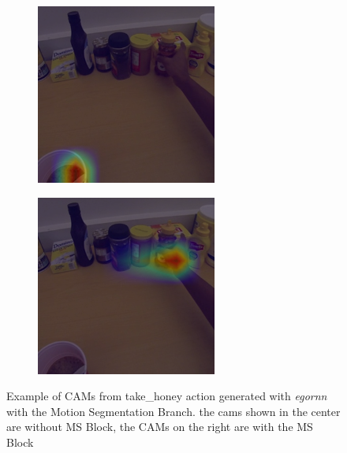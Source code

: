 \documentclass[10pt,twocolumn,hidelinks,letterpaper]{article}
\begin{document}
\begin{figure}[t]
\begin{subfigure}{.32\linewidth}
  \end{subfigure}
  \begin{subfigure}{.32\linewidth}
  	\includegraphics[width=\linewidth]{images/Cams2/S2_take_honey/rgb0007_CAM.png}
  \end{subfigure}
  \begin{subfigure}{.32\linewidth}
  	\includegraphics[width=\linewidth]{images/Cams2/S2_take_honey/rgb0007_CAM_MS.png}
  \end{subfigure}
  \caption{Example of CAMs from take\_honey action generated with \textit{egornn} with the Motion Segmentation Branch. the cams shown in the center are without MS Block, the CAMs on the right are with the MS Block}
  \label{cam2_1}
\end{figure}
\end{document}
